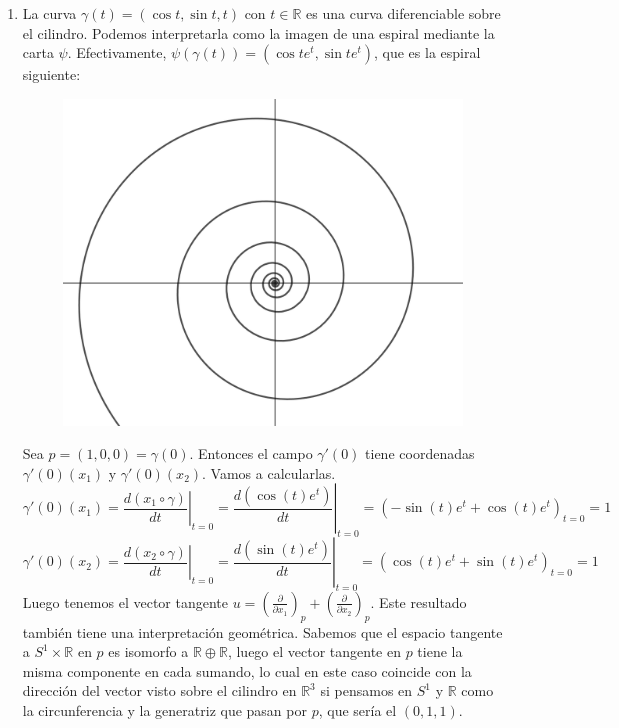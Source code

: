 \documentclass[twoside, 11pt]{article}
\theoremstyle{definition}
\newcommand{\R}{\mathbb{R}}
\newcommand{\parcial}[2]{\frac{\partial #1}{\partial #2}}
\begin{document}
\begin{enumerate}
\item La curva $\gamma(t)=(\cos t, \sin t, t)$ con $t\in\R$ es una curva diferenciable sobre el cilindro. Podemos interpretarla como la imagen de una espiral mediante la carta $\psi$. Efectivamente, $\psi(\gamma(t))=(\cos t e^t, \sin t e^t)$, que es la espiral siguiente:

\begin{figure}[h!]
\includegraphics[scale=0.3]{espiral}
\end{figure}


Sea $p=(1,0,0) =\gamma(0)$. Entonces el campo $\gamma'(0)$ tiene coordenadas $\gamma'(0)(x_1)$ y $\gamma'(0)(x_2)$. Vamos a calcularlas. 
\[
\gamma'(0)(x_1)=\left.\frac{d(x_1\circ\gamma)}{dt}\right|_{t=0}=\left.\frac{d(\cos(t)e^t)}{dt}\right|_{t=0}=(-\sin(t)e^t+\cos(t)e^t)_{t=0}=1
\]
\[
\gamma'(0)(x_2)=\left.\frac{d(x_2\circ\gamma)}{dt}\right|_{t=0}=\left.\frac{d(\sin(t)e^t)}{dt}\right|_{t=0}=(\cos(t)e^t+\sin(t)e^t)_{t=0}=1
\]
Luego tenemos el vector tangente $u=\left(\parcial{}{x_1}\right)_p+\left(\parcial{}{x_2}\right)_p$. Este resultado también tiene una interpretación geométrica. Sabemos que el espacio tangente a $S^1\times\R$ en $p$ es isomorfo a $\R\oplus\R$, luego el vector tangente en $p$ tiene la misma componente en cada sumando, lo cual en este caso coincide con la dirección del vector visto sobre el cilindro en $\R^3$ si pensamos en $S^1$ y $\R$ como la circunferencia y la generatriz que pasan por $p$, que sería el $(0,1,1)$. 


\end{enumerate}
\end{document}
